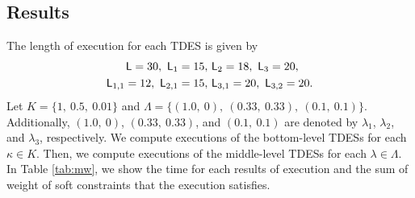 \documentclass[journal,twoside,web]{IEEEtran}
\newcommand{\Len}{{\sf L}}
\begin{document}
\subsection{Results}
%
The length of execution for each TDES is given by
\begin{align*}
\Len = 30,~\Len_1=15,&~\Len_2=18,~\Len_3=20,
\\
\Len_{1,1} = 12,~\Len_{2,1}=15,&~\Len_{3,1}=20,~\Len_{3,2}=20.
\end{align*}
Let $K=\{1,~0.5,~0.01\}$ and $\Lambda=\{(1.0,~0),~(0.33,~0.33),~(0.1,~0.1)\}$. 
Additionally, $(1.0,~0)$, $(0.33,~0.33)$, and $(0.1,~0.1)$ are denoted by $\lambda_1$, $\lambda_2$, and $\lambda_3$, respectively.
%
We compute executions of the bottom-level TDESs for each $\kappa\in K$.
Then, we compute executions of the middle-level TDESs for each $\lambda\in\Lambda$.
In Table \ref{tab:mw}, we show the time for each results of execution and the sum of weight of soft constraints that the execution satisfies.
\end{document}
